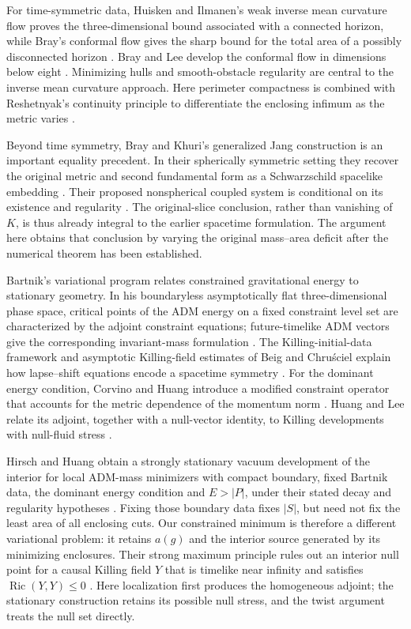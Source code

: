 For time-symmetric data, Huisken and Ilmanen's weak inverse mean
curvature flow proves the three-dimensional bound associated with a
connected horizon, while Bray's conformal flow gives the sharp bound
for the total area of a possibly disconnected horizon
\cite{HuiskenIlmanen2001,Bray2001}. Bray and Lee develop the conformal
flow in dimensions below eight \cite{BrayLee2009}. Minimizing hulls
and smooth-obstacle regularity are central to the inverse mean
curvature approach. Here perimeter compactness is combined with
Reshetnyak's continuity principle to differentiate the enclosing
infimum as the metric varies \cite{Reshetnyak1968,Spector2011}.

Beyond time symmetry, Bray and Khuri's generalized Jang construction
is an important equality precedent. In their spherically symmetric
setting they recover the original metric and second fundamental form
as a Schwarzschild spacelike embedding
\cite[Section~4]{BrayKhuri2010}. Their proposed nonspherical coupled
system is conditional on its existence and regularity
\cite[Section~5]{BrayKhuri2010}. The original-slice conclusion, rather
than vanishing of $K$, is thus already integral to the earlier
spacetime formulation. The argument here obtains that conclusion by
varying the original mass--area deficit after the numerical theorem
has been established.

Bartnik's variational program relates constrained gravitational
energy to stationary geometry. In his boundaryless asymptotically
flat three-dimensional phase space, critical points of the ADM energy
on a fixed constraint level set are characterized by the adjoint constraint
equations; future-timelike ADM vectors give the corresponding
invariant-mass formulation
\cite[Theorem~6.1 and Corollary~6.2]{Bartnik2005PhaseSpace}.
The Killing-initial-data framework and asymptotic Killing-field
estimates of Beig and Chru\'sciel explain how lapse--shift equations
encode a spacetime symmetry
\cite{BeigChrusciel1996,BeigChrusciel1997KID}.
For the dominant energy condition, Corvino and Huang introduce a
modified constraint operator that accounts for the metric dependence
of the momentum norm \cite[Section~2.2]{CorvinoHuang2020}.
Huang and Lee relate its adjoint, together with a null-vector identity,
to Killing developments with null-fluid stress
\cite[Section~6.1]{HuangLee2024Bartnik}.

Hirsch and Huang obtain a strongly stationary vacuum development of
the interior for local ADM-mass minimizers with compact boundary,
fixed Bartnik data, the dominant energy condition and $E>|P|$, under
their stated decay and regularity hypotheses
\cite[Theorem~7]{HirschHuang2025}. Fixing those boundary data fixes
$|S|$, but need not fix the least area of all enclosing cuts. Our
constrained minimum is therefore a different variational problem:
it retains $a(g)$ and the interior source generated by its minimizing
enclosures. Their strong maximum principle rules out an interior null
point for a causal Killing field $Y$ that is timelike near infinity
and satisfies $\operatorname{Ric}(Y,Y)\le0$
\cite[Theorem~4]{HirschHuang2025}. Here localization first produces the
homogeneous adjoint; the stationary construction retains its possible
null stress, and the twist argument treats the null set directly.

